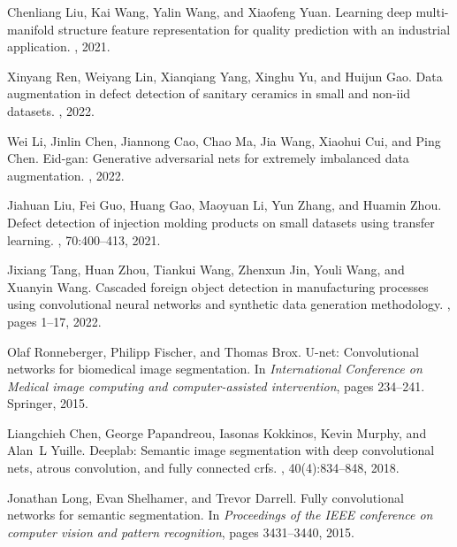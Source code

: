 \documentclass[sn-mathphys]{sn-jnl}%
\theoremstyle{thmstyleone}%
\theoremstyle{thmstyletwo}%
\theoremstyle{thmstylethree}%
\begin{document}
\begin{thebibliography}{10}
Chenliang Liu, Kai Wang, Yalin Wang, and Xiaofeng Yuan.
\newblock Learning deep multi-manifold structure feature representation for
  quality prediction with an industrial application.
, 2021.

Xinyang Ren, Weiyang Lin, Xianqiang Yang, Xinghu Yu, and Huijun Gao.
\newblock Data augmentation in defect detection of sanitary ceramics in small
  and non-iid datasets.
,
  2022.

Wei Li, Jinlin Chen, Jiannong Cao, Chao Ma, Jia Wang, Xiaohui Cui, and Ping
  Chen.
\newblock Eid-gan: Generative adversarial nets for extremely imbalanced data
  augmentation.
, 2022.

Jiahuan Liu, Fei Guo, Huang Gao, Maoyuan Li, Yun Zhang, and Huamin Zhou.
\newblock Defect detection of injection molding products on small datasets
  using transfer learning.
, 70:400--413, 2021.

Jixiang Tang, Huan Zhou, Tiankui Wang, Zhenxun Jin, Youli Wang, and Xuanyin
  Wang.
\newblock Cascaded foreign object detection in manufacturing processes using
  convolutional neural networks and synthetic data generation methodology.
, pages 1--17, 2022.

Olaf Ronneberger, Philipp Fischer, and Thomas Brox.
\newblock U-net: Convolutional networks for biomedical image segmentation.
\newblock In {\em International Conference on Medical image computing and
  computer-assisted intervention}, pages 234--241. Springer, 2015.

Liangchieh Chen, George Papandreou, Iasonas Kokkinos, Kevin Murphy, and Alan~L
  Yuille.
\newblock Deeplab: Semantic image segmentation with deep convolutional nets,
  atrous convolution, and fully connected crfs.
,
  40(4):834--848, 2018.

Jonathan Long, Evan Shelhamer, and Trevor Darrell.
\newblock Fully convolutional networks for semantic segmentation.
\newblock In {\em Proceedings of the IEEE conference on computer vision and
  pattern recognition}, pages 3431--3440, 2015.


\end{thebibliography}
\end{document}
